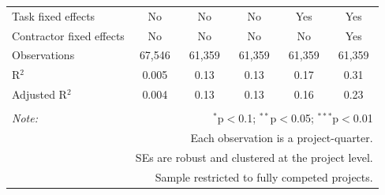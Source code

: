 \documentclass[
]{article}
\begin{document}
\begin{table}[H]
\begin{tabular}{@{\extracolsep{-2pt}}lccccc}
Task fixed effects & No & No & No & Yes & Yes \\ 
Contractor fixed effects & No & No & No & No & Yes \\ 
Observations & 67,546 & 61,359 & 61,359 & 61,359 & 61,359 \\ 
R$^{2}$ & 0.005 & 0.13 & 0.13 & 0.17 & 0.31 \\ 
Adjusted R$^{2}$ & 0.004 & 0.13 & 0.13 & 0.16 & 0.23 \\ 
\hline 
\hline \\[-1.8ex] 
\textit{Note:}  & \multicolumn{5}{r}{$^{*}$p$<$0.1; $^{**}$p$<$0.05; $^{***}$p$<$0.01} \\ 
 & \multicolumn{5}{r}{Each observation is a project-quarter.} \\ 
 & \multicolumn{5}{r}{SEs are robust and clustered at the project level.} \\ 
 & \multicolumn{5}{r}{Sample restricted to fully competed projects.} \\ 
\end{tabular} 
\end{table}
\end{document}

